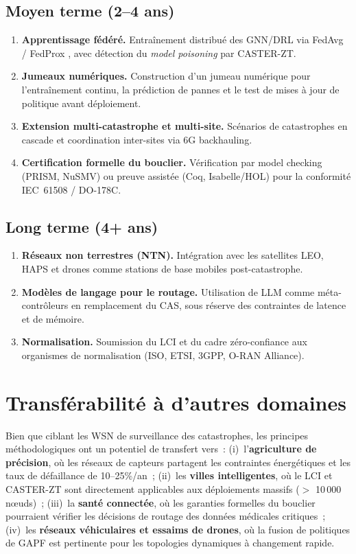 \subsection{Moyen terme (2--4 ans)}

\begin{enumerate}[resume]
    \item \textbf{Apprentissage fédéré.} Entraînement distribué des GNN/DRL via FedAvg \cite{McMahan2017FedAvg} / FedProx \cite{Li2020FedProx}, avec détection du \emph{model poisoning} par CASTER-ZT.
    \item \textbf{Jumeaux numériques.} Construction d'un jumeau numérique \cite{Nguyen2024DTORAN} pour l'entraînement continu, la prédiction de pannes et le test de mises à jour de politique avant déploiement.
    \item \textbf{Extension multi-catastrophe et multi-site.} Scénarios de catastrophes en cascade et coordination inter-sites via 6G backhauling.
    \item \textbf{Certification formelle du bouclier.} Vérification par model checking (PRISM, NuSMV) ou preuve assistée (Coq, Isabelle/HOL) pour la conformité IEC~61508 / DO-178C.
\end{enumerate}

\subsection{Long terme (4+ ans)}

\begin{enumerate}[resume]
    \item \textbf{Réseaux non terrestres (NTN).} Intégration avec les satellites LEO, HAPS et drones comme stations de base mobiles post-catastrophe.
    \item \textbf{Modèles de langage pour le routage.} Utilisation de LLM comme méta-contrôleurs en remplacement du CAS, sous réserve des contraintes de latence et de mémoire.
    \item \textbf{Normalisation.} Soumission du LCI et du cadre zéro-confiance aux organismes de normalisation (ISO, ETSI, 3GPP, O-RAN Alliance).
\end{enumerate}


\section{Transférabilité à d'autres domaines}\label{sec:concl-transferabilite}

Bien que ciblant les WSN de surveillance des catastrophes, les principes méthodologiques ont un potentiel de transfert vers~: (i)~l'\textbf{agriculture de précision}, où les réseaux de capteurs partagent les contraintes énergétiques et les taux de défaillance de 10--25\%/an~; (ii)~les \textbf{villes intelligentes}, où le LCI et CASTER-ZT sont directement applicables aux déploiements massifs ($>$ 10\,000 n\oe{}uds)~; (iii)~la \textbf{santé connectée}, où les garanties formelles du bouclier pourraient vérifier les décisions de routage des données médicales critiques~; (iv)~les \textbf{réseaux véhiculaires et essaims de drones}, où la fusion de politiques de GAPF est pertinente pour les topologies dynamiques à changement rapide.


